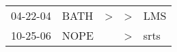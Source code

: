 \begin{supertabular}{p{0.07\textwidth}p{0.06\textwidth}p{0.02\textwidth}p{0.02\textwidth}p{0.06\textwidth}}
 04-22-04\textsuperscript{} &  BATH\textsuperscript{} &  \textgreater &  \textgreater &   LMS\textsuperscript{} \\
 10-25-06\textsuperscript{} &  NOPE\textsuperscript{} &               &  \textgreater &  srts\textsuperscript{} \\
\end{supertabular}
